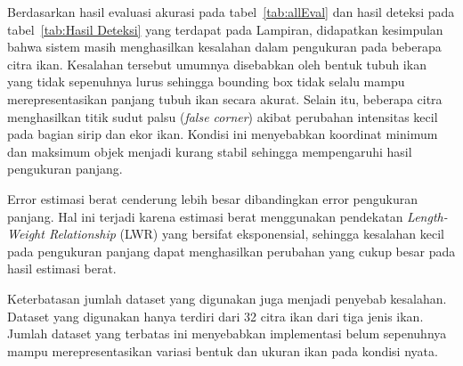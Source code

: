 
Berdasarkan hasil evaluasi akurasi pada tabel~\ref{tab:allEval} dan hasil deteksi pada tabel~\ref{tab:Hasil Deteksi} yang terdapat pada Lampiran, didapatkan kesimpulan bahwa sistem masih menghasilkan kesalahan dalam pengukuran pada beberapa citra ikan.
Kesalahan tersebut umumnya disebabkan oleh bentuk tubuh ikan yang tidak sepenuhnya lurus sehingga bounding box tidak selalu mampu merepresentasikan panjang tubuh ikan secara akurat.
Selain itu, beberapa citra menghasilkan titik sudut palsu (\emph{false corner}) akibat perubahan intensitas kecil pada bagian sirip dan ekor ikan. 
Kondisi ini menyebabkan koordinat minimum dan maksimum objek menjadi kurang stabil sehingga mempengaruhi hasil pengukuran panjang. 

Error estimasi berat cenderung lebih besar dibandingkan error pengukuran panjang. 
Hal ini terjadi karena estimasi berat menggunakan pendekatan \emph{Length-Weight Relationship} (LWR) yang bersifat eksponensial, sehingga kesalahan kecil pada pengukuran panjang dapat menghasilkan perubahan yang cukup besar pada hasil estimasi berat.

Keterbatasan jumlah dataset yang digunakan juga menjadi penyebab kesalahan. Dataset yang digunakan hanya terdiri dari 32 citra ikan dari tiga jenis ikan. 
Jumlah dataset yang terbatas ini menyebabkan implementasi belum sepenuhnya mampu merepresentasikan variasi bentuk dan ukuran ikan pada kondisi nyata.

